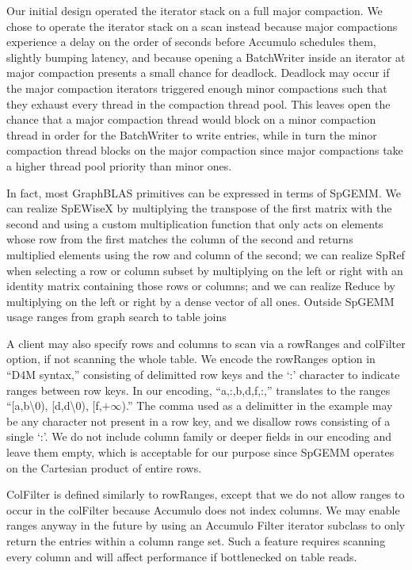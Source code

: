 


Our initial design operated the iterator stack on a full major compaction.
We chose to operate the iterator stack on a scan instead because major compactions experience
a delay on the order of seconds before Accumulo schedules them, slightly bumping latency,
and because opening a BatchWriter inside an iterator at major compaction presents a small chance for deadlock.
Deadlock may occur if the major compaction iterators triggered enough minor compactions 
such that they exhaust every thread in the compaction thread pool.
This leaves open the chance that a major compaction thread would block on a minor compaction thread
in order for the BatchWriter to write entries, while in turn the minor compaction thread blocks on 
the major compaction since major compactions take a higher thread pool priority than minor ones.




In fact, most GraphBLAS primitives can be expressed in terms of SpGEMM.
We can realize SpEWiseX by multiplying the transpose of the first matrix with the second
and using a custom multiplication function that only acts on elements whose row from the first 
matches the column of the second and returns multiplied elements using the row and column of the second;
we can realize SpRef when selecting a row or column subset by multiplying on the left or right with an identity matrix
containing those rows or columns;
and we can realize Reduce by multiplying on the left or right %
by a dense vector of all ones.
Outside SpGEMM usage ranges from graph search \cite{kepner2011graph} to table joins \cite{cohen2009mad} 




A client may also specify rows and columns to scan via a rowRanges and colFilter option, 
if not scanning the whole table. We encode the rowRanges option in ``D4M syntax,'' consisting of 
delimitted row keys and the `:' character to indicate ranges between row keys.
In our encoding, ``a,:,b,d,f,:,'' translates to the ranges 
``[a,b\textbackslash{}0), [d,d\textbackslash{}0), [f,$+\infty$).'' The comma used as a delimitter in the example 
may be any character not present in a row key, and we disallow rows consisting of a single `:'.
We do not include column family or deeper fields in our encoding and leave them empty, 
which is acceptable for our purpose since SpGEMM operates on the Cartesian product of entire rows.

ColFilter is defined similarly to rowRanges, except that we do not allow ranges to occur in the colFilter
because Accumulo does not index columns.  We may enable ranges anyway in the future by using an Accumulo
Filter iterator subclass to only return the entries within a column range set.
Such a feature requires scanning every column and will affect performance if bottlenecked on table reads.


